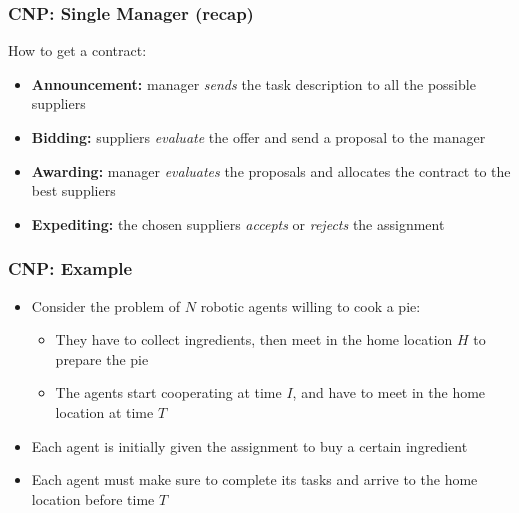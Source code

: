 \begin{frame}
	\frametitle{CNP: Single Manager (recap)}
	
	\Large
	
	\vspace{0.2cm}
	
	How to get a contract:
	
	\begin{itemize}
		\item \textbf{Announcement: } manager \emph{sends} the task description to all the
			  possible suppliers
		\vspace{0.1cm}
		\item \textbf{Bidding: } suppliers \emph{evaluate} the offer and send a proposal to
			  the manager
		\vspace{0.1cm}
		\item \textbf{Awarding: } manager \emph{evaluates} the proposals and allocates the
			  contract to the best suppliers
		\vspace{0.1cm}
		\item \textbf{Expediting: } the chosen suppliers \emph{accepts} or \emph{rejects}
			  the assignment
	\end{itemize}
\end{frame}

\begin{frame}
	\frametitle{CNP: Example}
	
	\Large
	
	\begin{itemize}
		\item Consider the problem of $ N $ robotic agents willing to cook a pie:
			  
			  \begin{itemize}
			  	  \item They have to collect ingredients, then meet in the home location
						$ H $ to prepare the pie
				  \vspace{0.05cm}
				  \item The agents start cooperating at time $ I $, and have to meet in the
						home location at time $ T $
			  \end{itemize}
		
		\item Each agent is initially given the assignment to buy a certain ingredient
		
		\item Each agent must make sure to complete its tasks and arrive to the home
			  location before time $ T $
	\end{itemize}
\end{frame}

